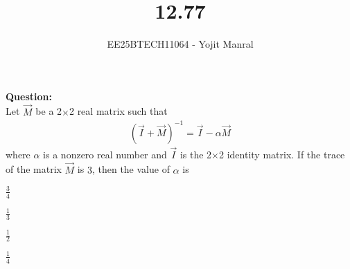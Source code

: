 \documentclass[journal]{IEEEtran}
\begin{document}

\vspace{3cm}

\title{12.77}
\author{EE25BTECH11064 - Yojit Manral}

\maketitle
{\let\newpage\relax\maketitle}
\renewcommand{\thefigure}{\theenumi}
\renewcommand{\thetable}{\theenumi}
\setlength{\intextsep}{10pt} %

\textbf{Question:}\\
Let $\vec{M}$ be a 2$\times$2 real matrix such that
\begin{align}
    (\vec{I}+\vec{M})^{-1} = \vec{I}-\alpha\vec{M}
\end{align}
where $\alpha$ is a nonzero real number and $\vec{I}$ is the 2$\times$2 identity matrix. If the trace of the matrix $\vec{M}$ is $3$, then the value of $\alpha$ is
\begin{enumerate}[label=(\alph*)]
\begin{multicols}{4}
    \item $\frac{3}{4}$
    \item $\frac{1}{3}$
    \item $\frac{1}{2}$
    \item $\frac{1}{4}$
\end{multicols}
\end{enumerate}
\end{document}

